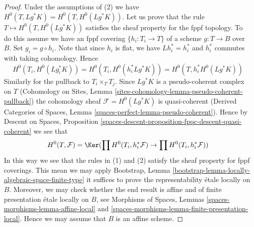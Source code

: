\begin{proof}
Under the assumptions of (2) we have $H^0(T, Lg^*K) = H^0(T, H^0(Lg^*K))$.
Let us prove that the rule $T \mapsto H^0(T, H^0(Lg^*K))$ satisfies the
sheaf property for the fppf topology. To do this assume we have an
fppf covering $\{h_i : T_i \to T\}$ of a scheme $g : T \to B$ over $B$.
Set $g_i = g \circ h_i$. Note that since $h_i$ is flat, we have
$Lh_i^* = h_i^*$ and $h_i^*$ commutes with taking cohomology. Hence
$$
H^0(T_i, H^0(Lg_i^*K)) =
H^0(T_i, H^0(h_i^*Lg^*K)) =
H^0(T, h_i^*H^0(Lg^*K))
$$
Similarly for the pullback to $T_i \times_T T_j$.
Since $Lg^*K$ is a pseudo-coherent complex on $T$
(Cohomology on Sites, Lemma
\ref{sites-cohomology-lemma-pseudo-coherent-pullback})
the cohomology sheaf $\mathcal{F} = H^0(Lg^*K)$ is quasi-coherent
(Derived Categories of Spaces, Lemma
\ref{spaces-perfect-lemma-pseudo-coherent}).
Hence by Descent on Spaces, Proposition
\ref{spaces-descent-proposition-fpqc-descent-quasi-coherent}
we see that
$$
H^0(T, \mathcal{F}) = \Ker(
\prod H^0(T_i, h_i^*\mathcal{F}) \to
\prod H^0(T_i, h_i^*\mathcal{F}))
$$
In this way we see that the rules in (1) and (2) satisfy
the sheaf property for fppf coverings. This mean we may apply
Bootstrap, Lemma \ref{bootstrap-lemma-locally-algebraic-space-finite-type}
it suffices to prove the representability \'etale locally on $B$. Moreover,
we may check whether the end result is affine and of finite presentation
\'etale locally on $B$, see
Morphisms of Spaces, Lemmas \ref{spaces-morphisms-lemma-affine-local} and
\ref{spaces-morphisms-lemma-finite-presentation-local}.
Hence we may assume that $B$ is an affine scheme.


\end{proof}
